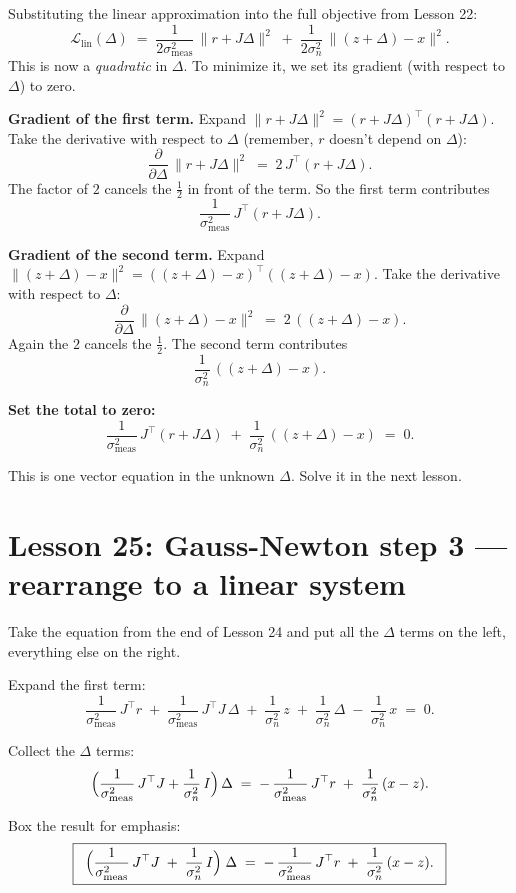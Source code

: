 \documentclass[11pt]{article}
\newcommand{\norm}[1]{\lVert #1 \rVert}
\begin{document}
Substituting the linear approximation into the full objective from
Lesson 22:
\[
\mathcal{L}_{\text{lin}}(\Delta)
\;=\;
\frac{1}{2 \sigma_{\text{meas}}^2}\,\norm{r + J \Delta}^2
\;+\;
\frac{1}{2 \sigma_n^2}\,\norm{(z + \Delta) - x}^2.
\]
This is now a \emph{quadratic} in $\Delta$. To minimize it, we set its
gradient (with respect to $\Delta$) to zero.

\textbf{Gradient of the first term.} Expand $\norm{r + J\Delta}^2 = (r +
J\Delta)^\top(r + J\Delta)$. Take the derivative with respect to $\Delta$
(remember, $r$ doesn't depend on $\Delta$):
\[
\frac{\partial}{\partial \Delta}\,\norm{r + J\Delta}^2
\;=\;
2\,J^\top(r + J\Delta).
\]
The factor of $2$ cancels the $\tfrac12$ in front of the term. So the
first term contributes
\[
\frac{1}{\sigma_{\text{meas}}^2}\,J^\top(r + J\Delta).
\]

\textbf{Gradient of the second term.} Expand $\norm{(z + \Delta) -
x}^2 = ((z + \Delta) - x)^\top((z + \Delta) - x)$. Take the derivative
with respect to $\Delta$:
\[
\frac{\partial}{\partial \Delta}\,\norm{(z + \Delta) - x}^2
\;=\;
2\,((z + \Delta) - x).
\]
Again the $2$ cancels the $\tfrac12$. The second term contributes
\[
\frac{1}{\sigma_n^2}\,((z + \Delta) - x).
\]

\textbf{Set the total to zero:}
\[
\frac{1}{\sigma_{\text{meas}}^2}\,J^\top(r + J\Delta)
\;+\;
\frac{1}{\sigma_n^2}\,((z + \Delta) - x)
\;=\;
0.
\]

This is one vector equation in the unknown $\Delta$. Solve it in the
next lesson.

\section{Lesson 25: Gauss-Newton step 3 --- rearrange to a linear system}

Take the equation from the end of Lesson 24 and put all the $\Delta$ terms on
the left, everything else on the right.

Expand the first term:
\[
\frac{1}{\sigma_{\text{meas}}^2}\,J^\top r
\;+\;
\frac{1}{\sigma_{\text{meas}}^2}\,J^\top J\,\Delta
\;+\;
\frac{1}{\sigma_n^2}\,z
\;+\;
\frac{1}{\sigma_n^2}\,\Delta
\;-\;
\frac{1}{\sigma_n^2}\,x
\;=\;
0.
\]

Collect the $\Delta$ terms:
\[
\Bigl(\frac{1}{\sigma_{\text{meas}}^2}\,J^\top J + \frac{1}{\sigma_n^2}\,I\Bigr)\,\Delta
\;=\;
-\,\frac{1}{\sigma_{\text{meas}}^2}\,J^\top r
\;+\;
\frac{1}{\sigma_n^2}\,(x - z).
\]

Box the result for emphasis:
\[
\boxed{\;\;
\Bigl(\frac{1}{\sigma_{\text{meas}}^2}\,J^\top J \;+\; \frac{1}{\sigma_n^2}\,I\Bigr)\;\Delta
\;=\;
-\,\frac{1}{\sigma_{\text{meas}}^2}\,J^\top r
\;+\;
\frac{1}{\sigma_n^2}\,(x - z).
\;\;}
\]
\end{document}
